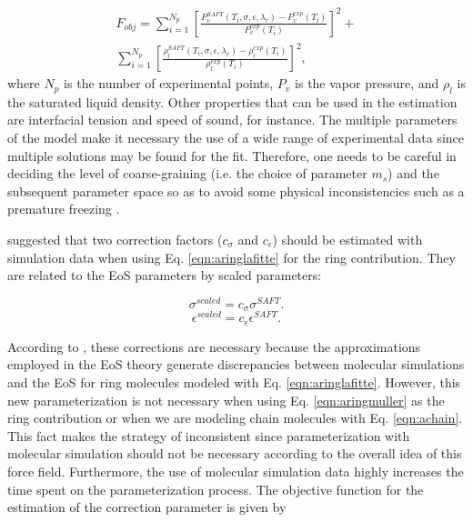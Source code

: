 \documentclass[
	12pt,				%
	openany,			%
	oneside,			%
	a4paper,			%
	english,			%
	brazil				%
	]{abntex2}
\providecommand{\DIFaddbegin}{}
\providecommand{\DIFaddend}{}
\providecommand{\DIFdelbegin}{}
\providecommand{\DIFdelend}{}
\providecommand{\DIFaddbegin}{} %
\providecommand{\DIFaddend}{} %
\providecommand{\DIFdelbegin}{} %
\providecommand{\DIFdelend}{} %
\begin{document}
\begin{equation}
\DIFdelbegin %
\DIFdelend \DIFaddbegin \begin{aligned}
F_{obj}= \sum_{i=1}^{N_{p}} \left[\frac{P_{v}^{SAFT}(T_{i},\sigma,\epsilon,\lambda_{r})-P_{v}^{exp}(T_{i})}{P_{v}^{exp}(T_{i})} \right]^2 +\\
\sum_{i=1}^{N_{p}} \left[\frac{\rho_{l}^{SAFT}(T_{i},\sigma,\epsilon,\lambda_{r})-\rho_{l}^{exp}(T_{i})}{\rho_{l}^{exp}(T_{i})} \right]^2 ,
\end{aligned}
\DIFaddend \label{eqn:fobj}
\end{equation}
where $N_{p}$ is the number of experimental points, $P_{v}$ is the vapor pressure, and $\rho_{l}$ is the saturated liquid density. Other properties that can be used in the estimation are interfacial tension and speed of sound, for instance. The multiple parameters of the model make it necessary the use of a wide range of experimental data since multiple solutions may be found for the fit. Therefore, one needs to be careful in deciding the level of coarse-graining (i.e. the choice of parameter $m_{s}$) and the subsequent parameter space so as to avoid some physical inconsistencies such as a premature freezing \cite{lobanova2015}.

 suggested that two correction factors ($c_{\sigma}$ and $c_{\epsilon}$) should be estimated with simulation data when using Eq. \eqref{eqn:aringlafitte} for the ring contribution. They are related to the EoS parameters by scaled parameters:

\begin{equation}
\sigma^{scaled} = c_{\sigma}\sigma^{SAFT}.
\label{eqn:csigma}
\end{equation}
\begin{equation}
\epsilon^{scaled} = c_{\epsilon}\epsilon^{SAFT}.
\label{eqn:ceps}
\end{equation}

According to , these corrections are necessary because the approximations employed in the EoS theory generate discrepancies between molecular simulations and the EoS for ring molecules modeled with Eq. \eqref{eqn:aringlafitte}. However, this new parameterization is not necessary when using Eq. \eqref{eqn:aringmuller} as the ring contribution or when we are modeling chain molecules with Eq. \ref{eqn:achain}. This fact makes the strategy of  inconsistent since parameterization with molecular simulation should not be necessary according to the overall idea of this force field. Furthermore, the use of molecular simulation data highly increases the time spent on the parameterization process. The objective function for the estimation of the correction parameter is given by
\end{document}
